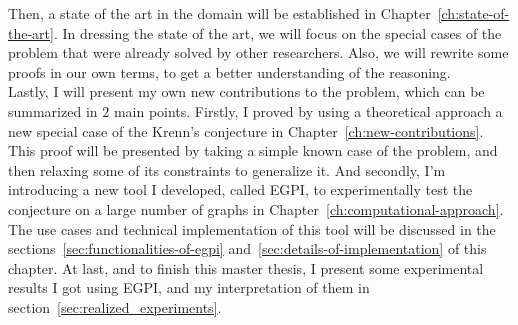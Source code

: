 Then, a state of the art in the domain will be established in Chapter~\ref{ch:state-of-the-art}.
In dressing the state of the art, we will focus on the special cases of the problem that were already solved by other researchers.
Also, we will rewrite some proofs in our own terms, to get a better understanding of the reasoning.\\

Lastly, I will present my own new contributions to the problem, which can be summarized in $2$ main points.
Firstly, I proved by using a theoretical approach a new special case of the Krenn's conjecture in Chapter~\ref{ch:new-contributions}.
This proof will be presented by taking a simple known case of the problem, and then relaxing some of its constraints to generalize it.
And secondly, I'm introducing a new tool I developed, called EGPI, to experimentally test the conjecture on a large number of graphs in Chapter~\ref{ch:computational-approach}.
The use cases and technical implementation of this tool will be discussed in the sections~\ref{sec:functionalities-of-egpi} and~\ref{sec:details-of-implementation} of this chapter.
At last, and to finish this master thesis, I present some experimental results I got using EGPI, and my interpretation of them in section~\ref{sec:realized_experiments}.\\


